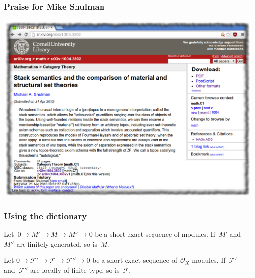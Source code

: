 \documentclass[12pt,utf8,notheorems,compress,t]{beamer}
\newcommand{\F}{\mathcal{F}}
\renewcommand{\O}{\mathcal{O}}
\renewcommand{\_}{\mathpunct{.}}
\newcommand{\?}{\,{:}\,}
\begin{document}
\begin{frame}[c]\frametitle{Praise for Mike Shulman}
  \centering
  \includegraphics[scale=0.4]{images/mike-shulman-stack-semantics}
  \par
\end{frame}

\begin{frame}\frametitle{Using the dictionary}
  \begin{center}
    \begin{minipage}{0.75\textwidth}
      \begin{exampleblock}{}
        \justifying
        Let~$0 \to M' \to M \to M'' \to 0$ be a short exact sequence of
        modules. If~$M'$ and~$M''$ are finitely generated, so is~$M$.
      \end{exampleblock}
    \end{minipage}
    \medskip

    \scalebox{3}{$\Downarrow$}

    \begin{minipage}{0.75\textwidth}
      \begin{exampleblock}{}
        \justifying
        Let $0 \to \F' \to \F \to \F'' \to 0$ be a short exact sequence
        of~$\O_X$-modules. If~$\F'$ and~$\F''$ are locally of finite type, so
        is~$\F$.
      \end{exampleblock}
    \end{minipage}
  \end{center}
\end{frame}
\end{document}
